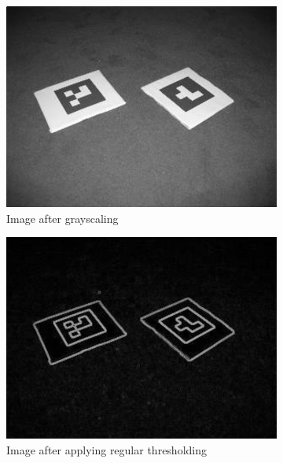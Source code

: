 \begin{figure}[thpb]
    \centering
    \begin{subfigure}[t]{0.45\columnwidth}
        \centering
        \includegraphics[width=\columnwidth]{gray.png}
				\caption{Image after grayscaling}
				\label{fig:gray}
    \end{subfigure}
    \begin{subfigure}[t]{0.45\columnwidth}
        \centering
        \includegraphics[width=\columnwidth]{thresh.png}
				\caption{Image after applying regular thresholding}
				\label{fig:thresh}
    \end{subfigure}
    \begin{subfigure}[b]{0.45\columnwidth}
        \centering

\end{subfigure}
\end{figure}
